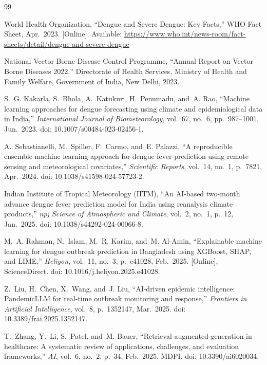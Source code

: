 \documentclass[conference]{IEEEtran}
\begin{document}
\begin{thebibliography}{99}

World Health Organization, ``Dengue and Severe Dengue: Key Facts,''
WHO Fact Sheet, Apr.\ 2023. [Online]. Available:
\url{https://www.who.int/news-room/fact-sheets/detail/dengue-and-severe-dengue}

National Vector Borne Disease Control Programme, ``Annual Report on
Vector Borne Diseases 2022,'' Directorate of Health Services, Ministry
of Health and Family Welfare, Government of India, New Delhi, 2023.

S.~G. Kakarla, S.~Bhola, A.~Katukuri, H.~Penumadu, and~A. Rao,
``Machine learning approaches for dengue forecasting using climate and
epidemiological data in India,'' \textit{International Journal of
Biometeorology}, vol.~67, no.~6, pp.~987--1001, Jun.\ 2023.
doi: 10.1007/s00484-023-02456-1.

A.~Sebastianelli, M.~Spiller, F.~Carmo, and~E. Palazzi,
``A reproducible ensemble machine learning approach for dengue fever
prediction using remote sensing and meteorological covariates,''
\textit{Scientific Reports}, vol.~14, no.~1, p.~7821, Apr.\ 2024.
doi: 10.1038/s41598-024-57723-2.

Indian Institute of Tropical Meteorology (IITM), ``An AI-based
two-month advance dengue fever prediction model for India using
reanalysis climate products,'' \textit{npj Science of Atmospheric
and Climate}, vol.~2, no.~1, p.~12, Jan.\ 2025.
doi: 10.1038/s44292-024-00066-8.

M.~A. Rahman, N.~Islam, M.~R. Karim, and~M. Al-Amin,
``Explainable machine learning for dengue outbreak prediction in
Bangladesh using XGBoost, SHAP, and LIME,'' \textit{Heliyon},
vol.~11, no.~3, p.~e41028, Feb.\ 2025. [Online], ScienceDirect.
doi: 10.1016/j.heliyon.2025.e41028.

Z.~Liu, H.~Chen, X.~Wang, and~J. Liu,
``AI-driven epidemic intelligence: PandemicLLM for real-time
outbreak monitoring and response,'' \textit{Frontiers in Artificial
Intelligence}, vol.~8, p.~1352147, Mar.\ 2025.
doi: 10.3389/frai.2025.1352147.

T.~Zhang, Y.~Li, S.~Patel, and~M. Bauer,
``Retrieval-augmented generation in healthcare: A systematic review
of applications, challenges, and evaluation frameworks,'' \textit{AI},
vol.~6, no.~2, p.~34, Feb.\ 2025. MDPI.
doi: 10.3390/ai6020034.


\end{thebibliography}
\end{document}
